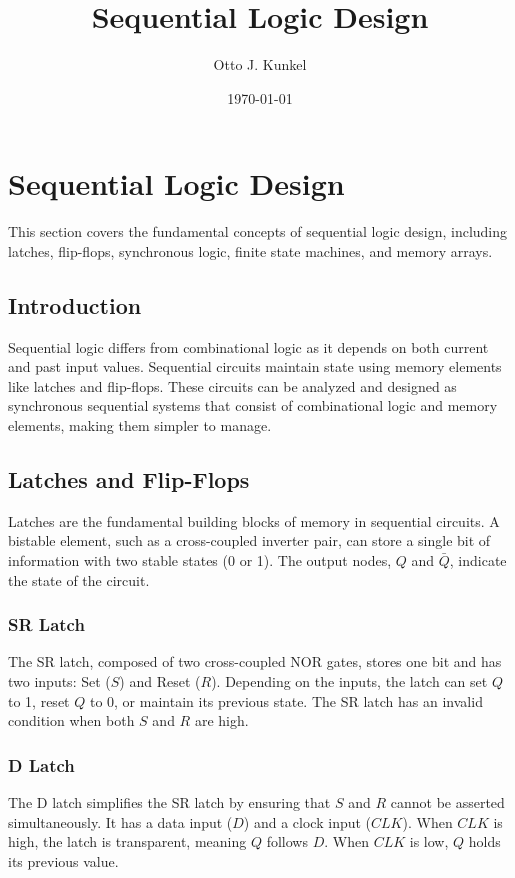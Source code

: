 \documentclass{article}
\title{Sequential Logic Design}
\author{Otto J. Kunkel}
\date{\today}
\begin{document}
\maketitle

\section{Sequential Logic Design}

This section covers the fundamental concepts of sequential logic design, including latches, flip-flops, synchronous logic, finite state machines, and memory arrays.

\subsection{Introduction}
Sequential logic differs from combinational logic as it depends on both current and past input values. Sequential circuits maintain state using memory elements like latches and flip-flops. These circuits can be analyzed and designed as synchronous sequential systems that consist of combinational logic and memory elements, making them simpler to manage.

\subsection{Latches and Flip-Flops}
Latches are the fundamental building blocks of memory in sequential circuits. A bistable element, such as a cross-coupled inverter pair, can store a single bit of information with two stable states (0 or 1). The output nodes, $Q$ and $\bar{Q}$, indicate the state of the circuit.

\subsubsection{SR Latch}
The SR latch, composed of two cross-coupled NOR gates, stores one bit and has two inputs: Set ($S$) and Reset ($R$). Depending on the inputs, the latch can set $Q$ to 1, reset $Q$ to 0, or maintain its previous state. The SR latch has an invalid condition when both $S$ and $R$ are high.

\subsubsection{D Latch}
The D latch simplifies the SR latch by ensuring that $S$ and $R$ cannot be asserted simultaneously. It has a data input ($D$) and a clock input ($CLK$). When $CLK$ is high, the latch is transparent, meaning $Q$ follows $D$. When $CLK$ is low, $Q$ holds its previous value.
\end{document}
